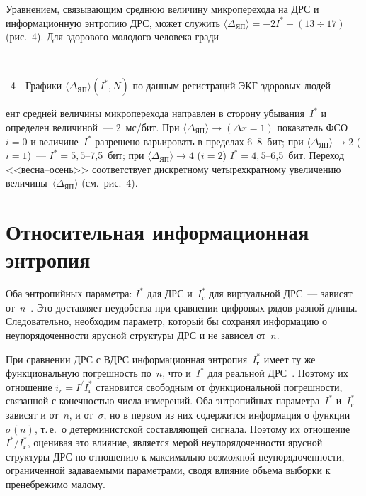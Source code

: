 \begin{multicols}{2}
  
  Уравнением, связывающим среднюю величину микроперехода на ДРС и 
информационную энтропию ДРС, может служить $\langle 
\Delta_{\mathrm{ЯП}}\rangle  = - 2I^* + (13\div 17)$ (рис.~4). Для 
здорового молодого человека гради-\linebreak
\begin{center} %
\mbox{%
\epsfxsize=70.456mm
}
\end{center}
\vspace*{3pt}
{{\figurename~4}\ \ \small{Графики $\langle\Delta_{\mathrm{ЯП}}\rangle (I^*, N)$ по данным 
регистраций ЭКГ здоровых людей}}

\addtocounter{figure}{1}


\noindent
ент средней величины микроперехода 
направлен в сторону убывания~$I^*$ и определен величиной~--- $2$~мс/бит. 
При $\langle \Delta_{\mathrm{ЯП}}\rangle \rightarrow (\Delta x = 1)$ показатель 
ФСО $i = 0$ и величине~$I^*$ разрешено варьировать в пределах 6--8~бит; 
при $\langle \Delta_{\mathrm{ЯП}}\rangle \rightarrow 2$ ($i = 1$)~--- $I^* = 
5{,}5$--7,5~бит; при $\langle \Delta_{\mathrm{ЯП}}\rangle  \rightarrow 4$ 
($i=2$) $I^* = 4{,}5$--6,5~бит. Переход <<весна--осень>> соответствует 
дискретному четырехкратному увеличению величины~$\langle 
\Delta_{\mathrm{ЯП}}\rangle $ (см.\ рис.~4). 

  
\section{Относительная информационная энтропия}
  
  Оба энтропийных параметра: $I^*$ для ДРС и~$I_{\mathrm{г}}^*$ для 
виртуальной ДРС~--- зависят от~$n$~\cite{3ku, 6ku}. Это доставляет неудобства 
при сравнении цифровых рядов разной длины. Следовательно, необходим 
параметр, который бы сохранял информацию о неупорядоченности ярусной 
структуры ДРС и не зависел от~$n$. 
  
  При сравнении ДРС с ВДРС информационная энтропия~$I_{\mathrm{г}}^*$ 
имеет ту же функциональную погрешность по~$n$, что и~$I^*$ для реальной 
ДРС~\cite{6ku}. Поэтому их отношение $i_r = I^/I_{\mathrm{г}}^*$ становится 
свободным от функциональной погрешности, связанной с конечностью числа 
измерений. Оба энтропийных параметра~$I^*$ и~$I_{\mathrm{г}}^*$ зависят и 
от~$n$, и от~$\sigma$, но в первом из них содержится информация о 
функции~$\sigma(n)$, т.\,е.\ о детерминистской составляющей сигнала. 
Поэтому их отношение $I^*/I_{\mathrm{г}}^*$, оценивая это влияние, является 
мерой неупорядоченности ярусной структуры ДРС по отношению к 
максимально возможной неупорядоченности, ограниченной задаваемыми 
параметрами, сводя влияние объема выборки к пренебрежимо малому.
  

\end{multicols}
